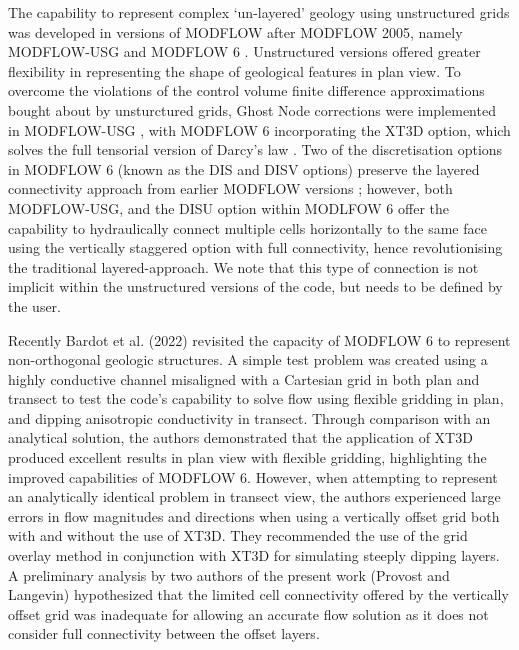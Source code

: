 \documentclass{article}
\begin{document}
The capability to represent complex ‘un-layered’ geology using unstructured grids was developed in versions of MODFLOW after MODFLOW 2005, namely MODFLOW-USG \citep{modflowusg} and MODFLOW 6 \citep{modflow6software}. Unstructured versions offered greater flexibility in representing the shape of geological features in plan view. To overcome the violations of the control volume finite difference approximations bought about by unsturctured grids, Ghost Node corrections were implemented in MODFLOW-USG \citep{modflowusg}, with MODFLOW 6 incorporating the XT3D option, which solves the full tensorial version of Darcy’s law \citep{modflow6xt3d}. Two of the discretisation options in MODFLOW 6 (known as the DIS and DISV options) preserve the layered connectivity approach from earlier MODFLOW versions \citep{modflow6framework}; however, both MODFLOW-USG, and the DISU option within MODLFOW 6 offer the capability to hydraulically connect multiple cells horizontally to the same face using the vertically staggered option with full connectivity, hence revolutionising the traditional layered-approach. We note that this type of connection is not implicit within the unstructured versions of the code, but needs to be defined by the user.

Recently Bardot et al. (2022) revisited the capacity of MODFLOW 6 to represent non-orthogonal geologic structures. A simple test problem was created using a highly conductive channel misaligned with a Cartesian grid in both plan and transect to test the code's capability to solve flow using flexible gridding in plan, and dipping anisotropic conductivity in transect. Through comparison with an analytical solution, the authors demonstrated that the application of XT3D produced excellent results in plan view with flexible gridding, highlighting the improved capabilities of MODFLOW 6. However, when attempting to represent an analytically identical problem in transect view, the authors experienced large errors in flow magnitudes and directions when using a vertically offset grid both with and without the use of XT3D. They recommended the use of the grid overlay method in conjunction with XT3D for simulating steeply dipping layers. A preliminary analysis by two authors of the present work (Provost and Langevin) hypothesized that the limited cell connectivity offered by the vertically offset grid was inadequate for allowing an accurate flow solution as it does not consider full connectivity between the offset layers.
\end{document}
